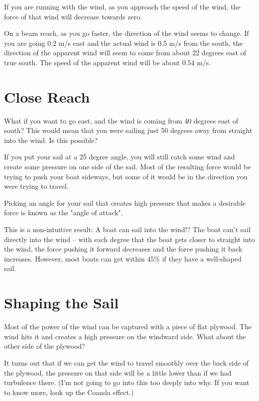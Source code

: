 If you are running with the wind,   as you approach the speed of the wind,  the force of that wind will decrease towards zero.

On a beam reach, as you go faster,  the direction of the wind seems to change.  If you are going 0.2 m/s east and the actual wind is 0.5 m/s from the south, the direction of the 
apparent wind will seem to come from about 22 degrees east of true south.  The speed of the apparent wind will be about 0.54 m/s.

\section{Close Reach}

What if you want to go east,  and the wind is coming from 40 degrees east of south?  This would mean that you were sailing just 50 degrees away from 
straight into the wind.   Is this possible?

If you put your sail at a 25 degree angle,   you will still catch some wind and create some pressure on one side of the sail.  Most of the resulting force would be trying to push
your boat sideways,  but some of it would be in the direction you were trying to travel. 

Picking an angle for your sail that creates high pressure that makes a desirable force is known as the "angle of attack".

This is a non-intuitive result: A boat can sail into the wind!?  The boat can't sail directly into the wind -- with each degree that the boat gets closer
to straight into the wind,  the force pushing it forward decreases and the force pushing it back increases.   However,  most boats can get within 45\% if they have a well-shaped sail.

\section{Shaping the Sail}

Most of the power of the wind can be captured with a piece of flat plywood.  The wind hits it and creates a high pressure on the windward side.   What about the other side of the plywood?

It turns out that if we can get the wind to travel smoothly over the back side of the plywood,   the pressure on that side will be a little lower than if we had turbulence there.   (I'm not going
to go into this too deeply into why.  If you want to know more,  look up the Coanda effect.)


